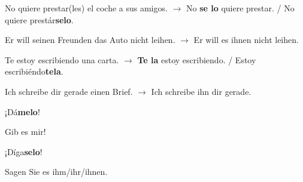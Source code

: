 \documentclass[a4paper, pagesize, DIV=15, fontsize=11pt, parskip=half, oneside, BCOR=5mm]{scrartcl}
\newcommand{\hl}[1]{\textbf{#1}}
\begin{document}
\begin{compactitem}
    \item No quiere prestar(les) el coche a sus amigos. $\rightarrow$ No \hl{se lo} quiere prestar. / No quiere prestár\hl{selo}.
    \begin{compactitem}\itshape
        \item Er will seinen Freunden das Auto nicht leihen. $\rightarrow$ Er will es ihnen nicht leihen.
    \end{compactitem}
    \item Te estoy escribiendo una carta. $\rightarrow$ \hl{Te la} estoy escribiendo. / Estoy escribiéndo\hl{tela}.
    \begin{compactitem}\itshape
        \item Ich schreibe dir gerade einen Brief. $\rightarrow$ Ich schreibe ihn dir gerade.
    \end{compactitem}
    \item ¡Dá\hl{melo}!
    \begin{compactitem}\itshape
        \item Gib es mir!
    \end{compactitem}
    \item ¡Díga\hl{selo}!
    \begin{compactitem}\itshape
        \item Sagen Sie es ihm/ihr/ihnen.
    \end{compactitem}
\end{compactitem}
\end{document}
